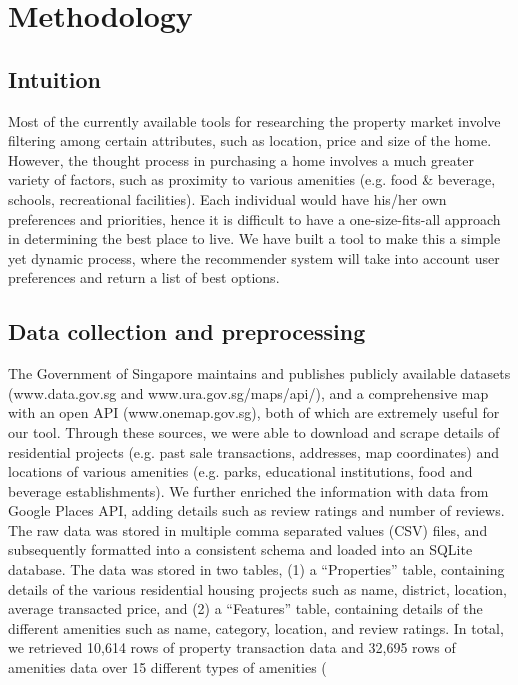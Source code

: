 \documentclass[a4paper, 11pt]{article}
\begin{document}
	\section{Methodology}
	
	\subsection{Intuition}
	
	Most of the currently available tools for researching the property market involve filtering among certain attributes, such as location, price and size of the home. However, the thought process in purchasing a home involves a much greater variety of factors, such as proximity to various amenities (e.g. food \& beverage, schools, recreational facilities). Each individual would have his/her own preferences and priorities, hence it is difficult to have a one-size-fits-all approach in determining the best place to live. We have built a tool to make this a simple yet dynamic process, where the recommender system will take into account user preferences and return a list of best options.
	
	\subsection{Data collection and preprocessing}
	
	The Government of Singapore maintains and publishes publicly available datasets (www.data.gov.sg and www.ura.gov.sg/maps/api/), and a comprehensive map with an open API (www.onemap.gov.sg), both of which are extremely useful for our tool. Through these sources, we were able to download and scrape details of residential projects (e.g. past sale transactions, addresses, map coordinates) and locations of various amenities (e.g. parks, educational institutions, food and beverage establishments). We further enriched the information with data from Google Places API, adding details such as review ratings and number of reviews. The raw data was stored in multiple comma separated values (CSV) files, and subsequently formatted into a consistent schema and loaded into an SQLite database. The data was stored in two tables, (1) a “Properties” table, containing details of the various residential housing projects such as name, district, location, average transacted price, and (2) a “Features” table, containing details of the different amenities such as name, category, location, and review ratings. In total, we retrieved 10,614 rows of property transaction data and 32,695 rows of amenities data over 15 different types of amenities (
\end{document}
